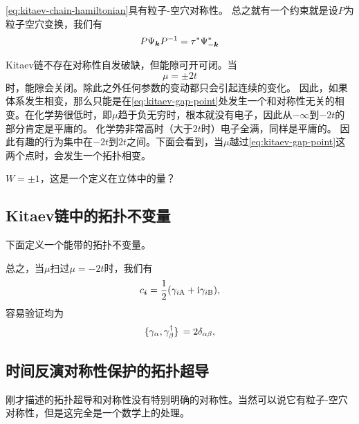 \eqref{eq:kitaev-chain-hamiltonian}具有粒子-空穴对称性。%
总之就有一个约束就是设$P$为粒子空穴变换，我们有
\[
    P {\Psi}_{\vb*{k}} P^{-1} = \tau^* {\Psi}_{-\vb*{k}}^*
\]

Kitaev链不存在对称性自发破缺，但能隙可开可闭。当
\begin{equation}
    \mu = \pm 2t
    \label{eq:kitaev-gap-point}
\end{equation}
时，能隙会关闭。除此之外任何参数的变动都只会引起连续的变化。
因此，如果体系发生相变，那么只能是在\eqref{eq:kitaev-gap-point}处发生一个和对称性无关的相变。在化学势很低时，即$\mu$趋于负无穷时，根本就没有电子，因此从$-\infty$到$-2t$的部分肯定是平庸的。
化学势非常高时（大于$2t$时）电子全满，同样是平庸的。
因此有趣的行为集中在$-2t$到$2t$之间。下面会看到，当$\mu$越过\eqref{eq:kitaev-gap-point}这两个点时，会发生一个拓扑相变。

$W = \pm 1$，这是一个定义在立体中的量？

\subsection{Kitaev链中的拓扑不变量}

下面定义一个能带的拓扑不变量。

总之，当$\mu$扫过$\mu=-2t$时，我们有
\[
    {c}_{\vb*{i}} = \frac{1}{2} ({\gamma}_{i\text{A}} + \mathrm{i} {\gamma}_{i \text{B}}),
\]
容易验证均为
\begin{equation}
    \acomm*{{\gamma}_\alpha}{{\gamma}_\beta^\dagger} = 2 \delta_{\alpha \beta},
\end{equation}

\subsection{时间反演对称性保护的拓扑超导}

刚才描述的拓扑超导和对称性没有特别明确的对称性。当然可以说它有粒子-空穴对称性，但是这完全是一个数学上的处理。